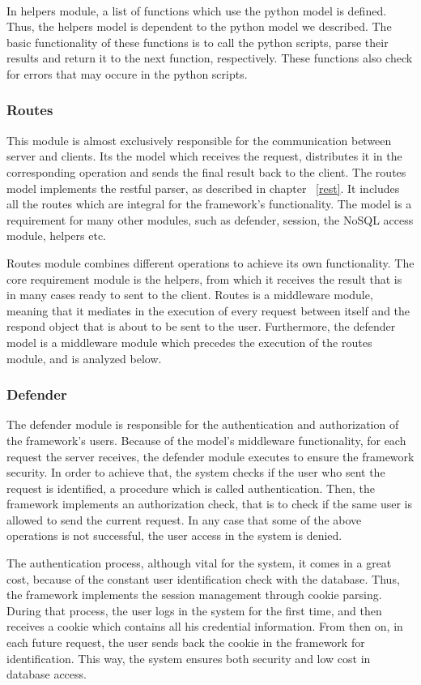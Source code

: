 \paragraph{}
In helpers module, a list of functions which use the python model is defined. Thus, the helpers model is dependent to the python model we described. The basic functionality of these functions is to call the python scripts, parse their results and return it to the next function, respectively. These functions also check for errors that may occure in the python scripts. 


\subsubsection{Routes}
This module is almost exclusively responsible for the communication between server and clients. Its the model which receives the request, distributes it in the corresponding operation and sends the final result back to the client. The routes model implements the restful parser, as described in chapter ~\ref{rest}. It includes all the routes which are integral for the framework's functionality. The model is a requirement for many other modules, such as defender, session, the NoSQL access module, helpers etc.\par
Routes module combines different operations to achieve its own functionality. The core requirement module is the helpers, from which it receives the result that is in many cases ready to sent to the client. Routes is a middleware module, meaning that it mediates in the execution of every request between itself and the respond object that is about to be sent to the user. Furthermore, the defender model is a middleware module which precedes the execution of the routes module, and is analyzed below.

\subsubsection{Defender}
The defender module is responsible for the authentication and authorization of the framework's users. Because of the model's middleware functionality, for each request the server receives, the defender module executes to ensure the framework security. In order to achieve that, the system checks if the user who sent the request is identified, a procedure which is called authentication. Then, the framework implements an authorization check, that is to check if the same user is allowed to send the current request. In any case that some of the above operations is not successful, the user access in the system is denied. \par
	The authentication process, although vital for the system, it comes in a great cost, because of the constant user identification check with the database. Thus, the framework implements the session management through cookie parsing. During that process, the user logs in the system for the first time, and then receives a cookie which contains all his credential information. From then on, in each future request, the user sends back the cookie in the framework for identification. This way, the system ensures both security and low cost in database access.


